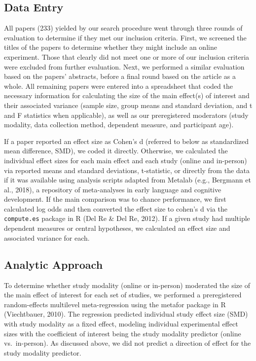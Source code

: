\documentclass[
  man,floatsintext]{apa6}
\begin{document}
\hypertarget{data-entry}{%
\subsection{Data Entry}\label{data-entry}}

All papers (233) yielded by our search procedure went through three rounds of evaluation to determine if they met our inclusion criteria. First, we screened the titles of the papers to determine whether they might include an online experiment. Those that clearly did not meet one or more of our inclusion criteria were excluded from further evaluation. Next, we performed a similar evaluation based on the papers' abstracts, before a final round based on the article as a whole. All remaining papers were entered into a spreadsheet that coded the necessary information for calculating the size of the main effect(s) of interest and their associated variance (sample size, group means and standard deviation, and t and F statistics when applicable), as well as our preregistered moderators (study modality, data collection method, dependent measure, and participant age).

If a paper reported an effect size as Cohen's d (referred to below as standardized mean difference, SMD), we coded it directly. Otherwise, we calculated the individual effect sizes for each main effect and each study (online and in-person) via reported means and standard deviations, t-statistic, or directly from the data if it was available using analysis scripts adapted from Metalab (e.g., Bergmann et al., 2018), a repository of meta-analyses in early language and cognitive development. If the main comparison was to chance performance, we first calculated log odds and then converted the effect size to cohen's d via the \texttt{compute.es} package in R (Del Re \& Del Re, 2012). If a given study had multiple dependent measures or central hypotheses, we calculated an effect size and associated variance for each.

\hypertarget{analytic-approach}{%
\subsection{Analytic Approach}\label{analytic-approach}}

To determine whether study modality (online or in-person) moderated the size of the main effect of interest for each set of studies, we performed a preregistered random-effects multilevel meta-regression using the metafor package in R (Viechtbauer, 2010). The regression predicted individual study effect size (SMD) with study modality as a fixed effect, modeling individual experimental effect sizes with the coefficient of interest being the study modality predictor (online vs.~in-person). As discussed above, we did not predict a direction of effect for the study modality predictor.
\end{document}
